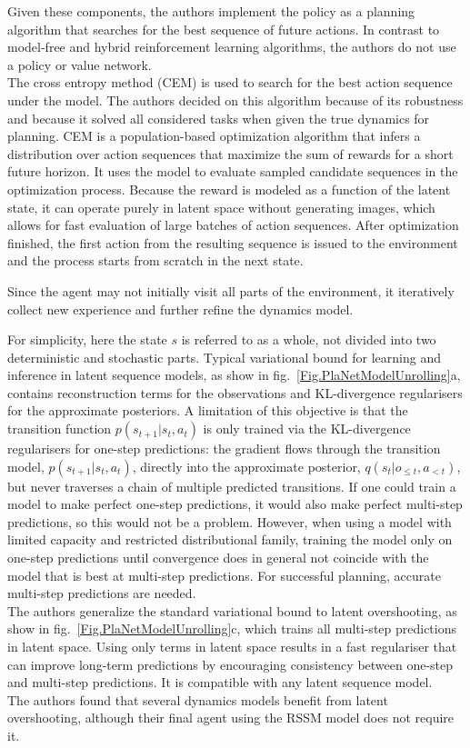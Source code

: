 Given these components, the authors implement the policy as a planning algorithm that searches for the best sequence of future actions. In contrast to model-free and hybrid reinforcement learning algorithms, the authors do not use a policy or value network. \\
The cross entropy method \cite{Algo.CEM} (CEM) is used to search for the best action sequence under the model. The authors decided on this algorithm because of its robustness and because it solved all considered tasks when given the true dynamics for planning. CEM is a population-based optimization algorithm that infers a distribution over action sequences that maximize the sum of rewards for a short future horizon. It uses the model to evaluate sampled candidate sequences in the optimization process. Because the reward is modeled as a function of the latent state, it can operate purely in latent space without generating images, which allows for fast evaluation of large batches of action sequences. After optimization finished, the first action from the resulting sequence is issued to the environment and the process starts from scratch in the next state.

Since the agent may not initially visit all parts of the environment, it iteratively collect new experience and further refine the dynamics model.

For simplicity, here the state $s$ is referred to as a whole, not divided into two deterministic and stochastic parts. Typical variational bound for learning and inference in latent sequence models, as show in fig.~\ref{Fig.PlaNetModelUnrolling}a, contains reconstruction terms for the observations and KL-divergence regularisers for the approximate posteriors. A limitation of this objective is that the transition function $p(s_{t+1} | s_t, a_t)$ is only trained via the KL-divergence regularisers for one-step predictions: the gradient flows through the transition model, $p(s_{t+1} | s_t, a_t)$, directly into the approximate posterior, $q(s_t | o_{\leqslant t}, a_{< t})$, but never traverses a chain of multiple predicted transitions. If one could train a model to make perfect one-step predictions, it would also make perfect multi-step predictions, so this would not be a problem. However, when using a model with limited capacity and restricted distributional family, training the model only on one-step predictions until convergence does in general not coincide with the model that is best at multi-step predictions. For successful planning, accurate multi-step predictions are needed. \\
The authors generalize the standard variational bound to latent overshooting, as show in fig.~\ref{Fig.PlaNetModelUnrolling}c, which trains all multi-step predictions in latent space. Using only terms in latent space results in a fast regulariser that can improve long-term predictions by encouraging consistency between one-step and multi-step predictions. It is compatible with any latent sequence model. \\
The authors found that several dynamics models benefit from latent overshooting, although their final agent using the RSSM model does not require it.

